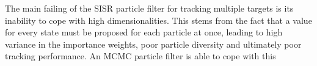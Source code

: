 The main failing of the SISR particle filter for tracking multiple targets is its inability to cope with high dimensionalities. This stems from the fact that a value for every state must be proposed for each particle at once, leading to high variance in the importance weights, poor particle diversity and ultimately poor tracking performance. An MCMC particle filter is able to cope with this